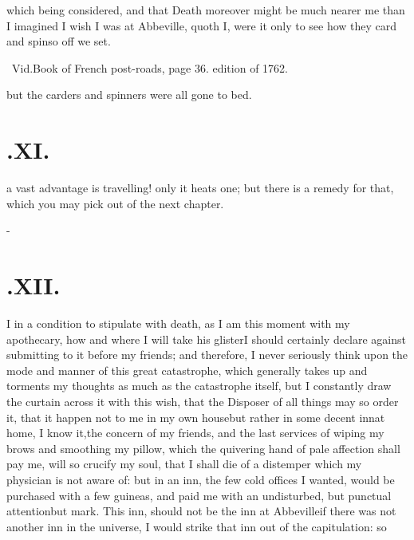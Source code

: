 \documentclass{article}
\begin{document}
 which being considered, and\break
that Death moreover might be\break
much nearer me than I imagined\tsh\break
I wish I was at Abbeville, quoth I,
were it only to see how they card and spin\tsh so off we
set.

\noindent
{}\break
{}

\bgroup\footnotesize
\noindent\quad\lower-2pt\hbox{\ast}\ Vid.\@ Book of French post-roads, page 36.\break
edition of 1762.
\par\egroup
{}
\eject
\noindent
{}

\noindent
\tsh but the carders and spinners were all gone to bed.

\bigskip

\section{.\enspace XI.}

 a vast advantage is travelling!
only it heats one; but there is a remedy for that, which you may
pick out of the next chapter.

\vfill{}\eject
\null\kern-\baselineskip
\section{.\enspace XII.}

 I in a condition to stipulate with
death, as I am this moment with my apothecary, how and where I
will take his glister\tsh I should certainly declare against
submitting to it before my friends; and therefore, I never
seriously think upon the mode and manner of this great
catastrophe, which generally takes up and torments my thoughts
as much as the catastrophe itself, but I constantly draw the
curtain across it with this wish, that the Disposer of all
things may so order it, that it happen not to me in my own
house\tsh but rather in some decent inn\tsh at home, I know
it,\tsh the concern of my friends, and the last services of
wiping my brows and smoothing my pillow, which the quivering
hand of pale affection shall pay me, will so crucify my soul,
that I shall die of a distemper which my physician is not aware
of: but in an inn, the few cold offices I wanted, would be
purchased with a few guineas, and paid me with an undisturbed,
but punctual attention\tsh but mark.  This inn, should not be
the inn at Abbeville\break\tsh if there was not another inn in
the universe, I would strike that inn out of the capitulation:
so
\end{document}
